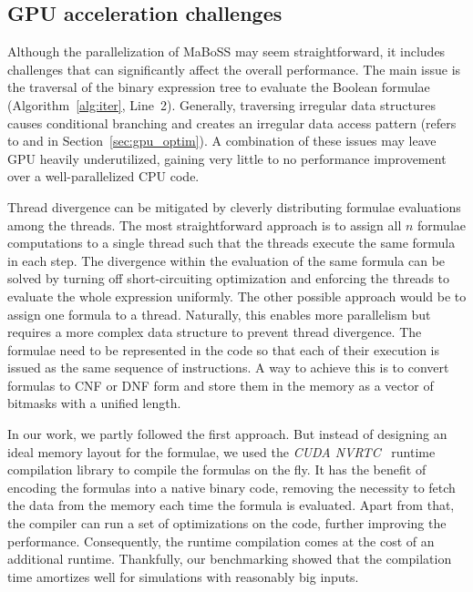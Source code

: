 \subsection{GPU acceleration challenges}

Although the parallelization of MaBoSS may seem straightforward, it includes challenges that can significantly affect the overall performance. The main issue is the traversal of the binary expression tree to evaluate the Boolean formulae (Algorithm~\ref{alg:iter}, Line~2). Generally, traversing irregular data structures causes conditional branching and creates an irregular data access pattern (refers to  and  in Section~\ref{sec:gpu_optim}). A combination of these issues may leave GPU heavily underutilized, gaining very little to no performance improvement over a well-parallelized CPU code.

Thread divergence can be mitigated by cleverly distributing formulae evaluations among the threads. The most straightforward approach is to assign all $n$ formulae computations to a single thread such that the threads execute the same formula in each step. The divergence within the evaluation of the same formula can be solved by turning off short-circuiting optimization and enforcing the threads to evaluate the whole expression uniformly.
The other possible approach would be to assign one formula to a thread. Naturally, this enables more parallelism but requires a more complex data structure to prevent thread divergence. The formulae need to be represented in the code so that each of their execution is issued as the same sequence of instructions. A way to achieve this is to convert formulas to CNF or DNF form and store them in the memory as a vector of bitmasks with a unified length.

In our work, we partly followed the first approach. But instead of designing an ideal memory layout for the formulae, we used the \emph{CUDA NVRTC}~\cite{nvrtc-online} runtime compilation library to compile the formulas on the fly. It has the benefit of encoding the formulas into a native binary code, removing the necessity to fetch the data from the memory each time the formula is evaluated. Apart from that, the compiler can run a set of optimizations on the code, further improving the performance. Consequently, the runtime compilation comes at the cost of an additional runtime. Thankfully, our benchmarking showed that the compilation time amortizes well for simulations with reasonably big inputs.

